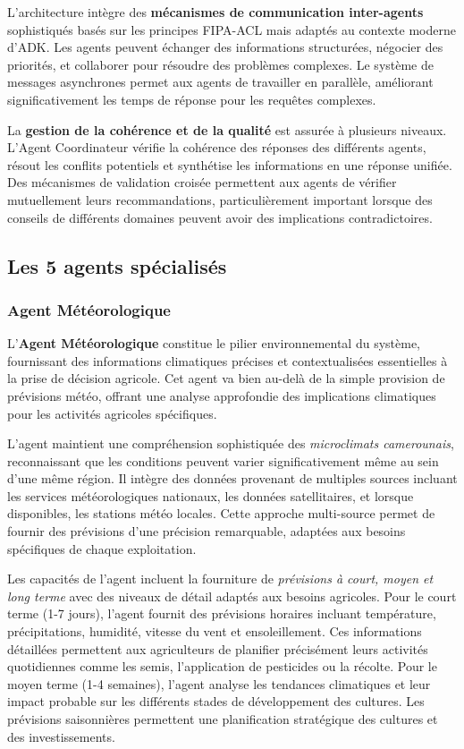 L'architecture intègre des \textbf{mécanismes de communication inter-agents} sophistiqués basés sur les principes FIPA-ACL mais adaptés au contexte moderne d'ADK. Les agents peuvent échanger des informations structurées, négocier des priorités, et collaborer pour résoudre des problèmes complexes. Le système de messages asynchrones permet aux agents de travailler en parallèle, améliorant significativement les temps de réponse pour les requêtes complexes.

La \textbf{gestion de la cohérence et de la qualité} est assurée à plusieurs niveaux. L'Agent Coordinateur vérifie la cohérence des réponses des différents agents, résout les conflits potentiels et synthétise les informations en une réponse unifiée. Des mécanismes de validation croisée permettent aux agents de vérifier mutuellement leurs recommandations, particulièrement important lorsque des conseils de différents domaines peuvent avoir des implications contradictoires.

\subsection{Les 5 agents spécialisés}

\subsubsection{Agent Météorologique}

L'\textbf{Agent Météorologique} constitue le pilier environnemental du système, fournissant des informations climatiques précises et contextualisées essentielles à la prise de décision agricole. Cet agent va bien au-delà de la simple provision de prévisions météo, offrant une analyse approfondie des implications climatiques pour les activités agricoles spécifiques.

L'agent maintient une compréhension sophistiquée des \emph{microclimats camerounais}, reconnaissant que les conditions peuvent varier significativement même au sein d'une même région. Il intègre des données provenant de multiples sources incluant les services météorologiques nationaux, les données satellitaires, et lorsque disponibles, les stations météo locales. Cette approche multi-source permet de fournir des prévisions d'une précision remarquable, adaptées aux besoins spécifiques de chaque exploitation.

Les capacités de l'agent incluent la fourniture de \emph{prévisions à court, moyen et long terme} avec des niveaux de détail adaptés aux besoins agricoles. Pour le court terme (1-7 jours), l'agent fournit des prévisions horaires incluant température, précipitations, humidité, vitesse du vent et ensoleillement. Ces informations détaillées permettent aux agriculteurs de planifier précisément leurs activités quotidiennes comme les semis, l'application de pesticides ou la récolte. Pour le moyen terme (1-4 semaines), l'agent analyse les tendances climatiques et leur impact probable sur les différents stades de développement des cultures. Les prévisions saisonnières permettent une planification stratégique des cultures et des investissements.


